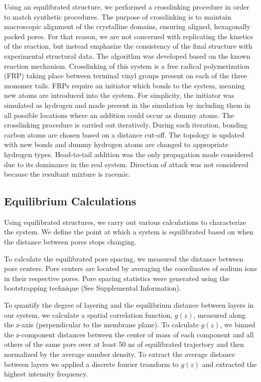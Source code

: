 \documentclass{article}
\begin{document}
  Using an equilibrated structure, we performed a crosslinking procedure
  in order to match synthetic procedures. The purpose of crosslinking
  is to maintain macroscopic alignment of the crystalline domains, 
  ensuring aligned, hexagonally packed pores. For that reason, we are not
  concerned with replicating the kinetics of the reaction, but instead emphasize
  the consistency of the final structure with experimental structural data. The
  algorithm was developed based on the known reaction mechanism. Crosslinking of
  this system is a free radical polymerization (FRP) taking place between
  terminal vinyl groups present on each of the three monomer tails. FRPs require
  an initiator which bonds to the system, meaning new atoms are introduced into
  the system. For simplicity, the initiator was simulated as hydrogen and made
  present in the simulation by including them in all possible locations where an 
  addition could occur as dummy atoms. The crosslinking procedure is carried out
  iteratively. During each iteration, bonding carbon atoms are chosen based on
  a distance cut-off. The topology is updated with new bonds and dummy hydrogen
  atoms are changed to appropriate hydrogen types. Head-to-tail addition was the
  only propagation mode considered due to its dominance in the real system.
  Direction of attack was not considered because the resultant mixture is
  racemic.

  \subsection*{Equilibrium Calculations}

  Using equilibrated structures, we carry out various calculations to
  characterize the system. We define the point at which a system is
  equilibrated based on when the distance between pores stops changing.

  To calculate the equilibrated pore spacing, we measured the distance between
  pore centers. Pore centers are located by averaging the coordinates of sodium
  ions in their respective pores. Pore spacing statistics were generated 
  using the bootstrapping technique (See Supplemental Information).

  To quantify the degree of layering and the equilibrium distance between layers
  in our system, we calculate a spatial correlation function, $g(z)$, measured
  along the z-axis (perpendicular to the membrane plane). To calculate $g(z)$,
  we binned the z-component distances between the center of mass of each
  component and all others of the same pore over at least 50 ns of equilibrated
  trajectory and then normalized by the average number density. To extract the
  average distance between layers we applied a discrete fourier transform to
  $g(z)$ and extracted the highest intensity frequency.
\end{document}

